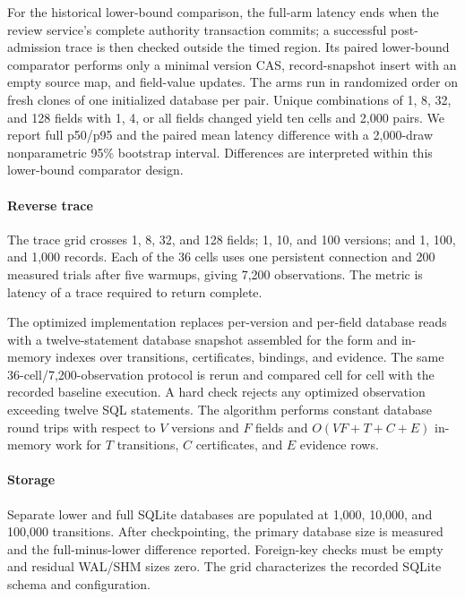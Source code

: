 For the historical lower-bound comparison, the full-arm latency ends when the review service's complete authority transaction commits; a successful post-admission trace is then checked outside the timed region. Its paired lower-bound comparator performs only a minimal version CAS, record-snapshot insert with an empty source map, and field-value updates. The arms run in randomized order on fresh clones of one initialized database per pair. Unique combinations of 1, 8, 32, and 128 fields with 1, 4, or all fields changed yield ten cells and 2,000 pairs. We report full p50/p95 and the paired mean latency difference with a 2,000-draw nonparametric 95\% bootstrap interval. Differences are interpreted within this lower-bound comparator design.

\paragraph{Reverse trace}
The trace grid crosses 1, 8, 32, and 128 fields; 1, 10, and 100 versions; and 1, 100, and 1,000 records. Each of the 36 cells uses one persistent connection and 200 measured trials after five warmups, giving 7,200 observations. The metric is latency of a trace required to return complete.

The optimized implementation replaces per-version and per-field database reads with a twelve-statement database snapshot assembled for the form and in-memory indexes over transitions, certificates, bindings, and evidence. The same 36-cell/7,200-observation protocol is rerun and compared cell for cell with the recorded baseline execution. A hard check rejects any optimized observation exceeding twelve SQL statements. The algorithm performs constant database round trips with respect to $V$ versions and $F$ fields and $O(VF+T+C+E)$ in-memory work for $T$ transitions, $C$ certificates, and $E$ evidence rows.

\paragraph{Storage}
Separate lower and full SQLite databases are populated at 1,000, 10,000, and 100,000 transitions. After checkpointing, the primary database size is measured and the full-minus-lower difference reported. Foreign-key checks must be empty and residual WAL/SHM sizes zero. The grid characterizes the recorded SQLite schema and configuration.
